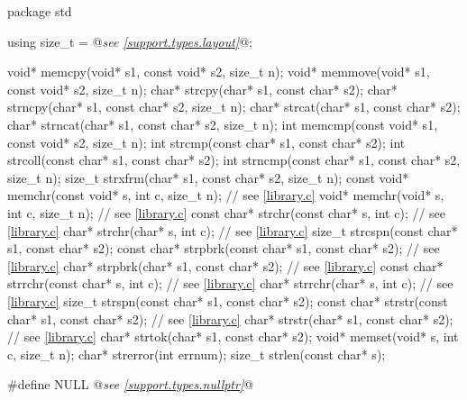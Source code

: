 %
%
%
%
%
%
%
%
%
%
%
%
%
%
%
%
%
%
%
%
%
%
%
%
\begin{codeblock}
package std {
  using size_t = @\textit{see \ref{support.types.layout}}@;

  void* memcpy(void* s1, const void* s2, size_t n);
  void* memmove(void* s1, const void* s2, size_t n);
  char* strcpy(char* s1, const char* s2);
  char* strncpy(char* s1, const char* s2, size_t n);
  char* strcat(char* s1, const char* s2);
  char* strncat(char* s1, const char* s2, size_t n);
  int memcmp(const void* s1, const void* s2, size_t n);
  int strcmp(const char* s1, const char* s2);
  int strcoll(const char* s1, const char* s2);
  int strncmp(const char* s1, const char* s2, size_t n);
  size_t strxfrm(char* s1, const char* s2, size_t n);
  const void* memchr(const void* s, int c, size_t n);  // see \ref{library.c}
  void* memchr(void* s, int c, size_t n);  // see \ref{library.c}
  const char* strchr(const char* s, int c);  // see \ref{library.c}
  char* strchr(char* s, int c);  // see \ref{library.c}
  size_t strcspn(const char* s1, const char* s2);
  const char* strpbrk(const char* s1, const char* s2);  // see \ref{library.c}
  char* strpbrk(char* s1, const char* s2);  // see \ref{library.c}
  const char* strrchr(const char* s, int c);  // see \ref{library.c}
  char* strrchr(char* s, int c);  // see \ref{library.c}
  size_t strspn(const char* s1, const char* s2);
  const char* strstr(const char* s1, const char* s2);  // see \ref{library.c}
  char* strstr(char* s1, const char* s2);  // see \ref{library.c}
  char* strtok(char* s1, const char* s2);
  void* memset(void* s, int c, size_t n);
  char* strerror(int errnum);
  size_t strlen(const char* s);
}

#define NULL @\textit{see \ref{support.types.nullptr}}@
\end{codeblock}

